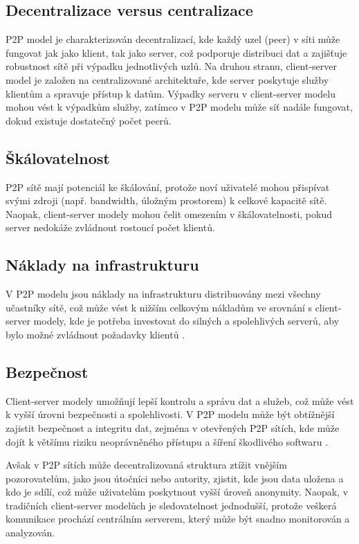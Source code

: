 \documentclass[10pt,twoside,czech,a4paper]{article}
\begin{document}
\subsection{Decentralizace versus centralizace}

P2P model je charakterizován decentralizací, kde každý uzel (peer) v síti může fungovat jak jako klient, tak jako server, což podporuje distribuci dat a zajišťuje robustnost sítě při výpadku jednotlivých uzlů.
Na druhou stranu, client-server model je založen na centralizované architektuře, kde server poskytuje služby klientům a spravuje přístup k datům.
Výpadky serveru v client-server modelu mohou vést k výpadkům služby, zatímco v P2P modelu může síť nadále fungovat, dokud existuje dostatečný počet peerů.

\subsection{Škálovatelnost}

P2P sítě mají potenciál ke škálování, protože noví uživatelé mohou přispívat svými zdroji (např. bandwidth, úložným prostorem) k celkové kapacitě sítě.
Naopak, client-server modely mohou čelit omezením v škálovatelnosti, pokud server nedokáže zvládnout rostoucí počet klientů.

\subsection{Náklady na infrastrukturu}

V P2P modelu jsou náklady na infrastrukturu distribuovány mezi všechny učastníky sítě, což může vést k nižším celkovým nákladům ve srovnání s client-server modely, kde je potřeba investovat do silných a spolehlivých serverů, aby bylo možné zvládnout požadavky klientů \cite{Leibnitz2007}.

\subsection{Bezpečnost}

Client-server modely umožňují lepší kontrolu a správu dat a služeb, což může vést k vyšší úrovni bezpečnosti a spolehlivosti.
V P2P modelu může být obtížnější zajistit bezpečnost a integritu dat, zejména v otevřených P2P sítích, kde může dojít k většímu riziku neoprávněného přístupu a šíření škodlivého softwaru \cite{Leibnitz2007}.

Avšak v P2P sítích může decentralizovaná struktura ztížit vnějším pozorovatelům, jako jsou útočníci nebo autority, zjistit, kde jsou data uložena a kdo je sdílí, což může uživatelům poskytnout vyšší úroveň anonymity.
Naopak, v tradičních client-server modelůch je sledovatelnost jednodušší, protože veškerá komunikace prochází centrálním serverem, který může být snadno monitorován a analyzován.
\end{document}

